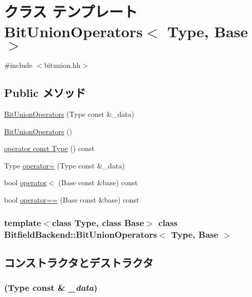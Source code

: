 \hypertarget{classBitfieldBackend_1_1BitUnionOperators}{
\section{クラス テンプレート BitUnionOperators$<$ Type, Base $>$}
\label{classBitfieldBackend_1_1BitUnionOperators}
}


{\ttfamily \#include $<$bitunion.hh$>$}\subsection*{Public メソッド}
\begin{DoxyCompactItemize}
\item 
\hyperlink{classBitfieldBackend_1_1BitUnionOperators_a9f969fb21a46001a18419f55cdb32552}{BitUnionOperators} (Type const \&\_\-data)
\item 
\hyperlink{classBitfieldBackend_1_1BitUnionOperators_a77244156b463c15d38edeedc5bc0b7ee}{BitUnionOperators} ()
\item 
\hyperlink{classBitfieldBackend_1_1BitUnionOperators_a14bc478d07abb05059cab5049412ea5e}{operator const Type} () const 
\item 
Type \hyperlink{classBitfieldBackend_1_1BitUnionOperators_a001b4643ed067a61bedf2b991b675902}{operator=} (Type const \&\_\-data)
\item 
bool \hyperlink{classBitfieldBackend_1_1BitUnionOperators_a8fd6e7ab1c7c044ce528929ea335bce8}{operator$<$} (Base const \&base) const 
\item 
bool \hyperlink{classBitfieldBackend_1_1BitUnionOperators_aa3dda9b980015ebdb371d6bdd3facb00}{operator==} (Base const \&base) const 
\end{DoxyCompactItemize}
\subsubsection*{template$<$class Type, class Base$>$ class BitfieldBackend::BitUnionOperators$<$ Type, Base $>$}



\subsection{コンストラクタとデストラクタ}
\hypertarget{classBitfieldBackend_1_1BitUnionOperators_a9f969fb21a46001a18419f55cdb32552}{
\subsubsection[{BitUnionOperators}]{ (Type const \& {\em \_\-data})}}
\label{classBitfieldBackend_1_1BitUnionOperators_a9f969fb21a46001a18419f55cdb32552}



